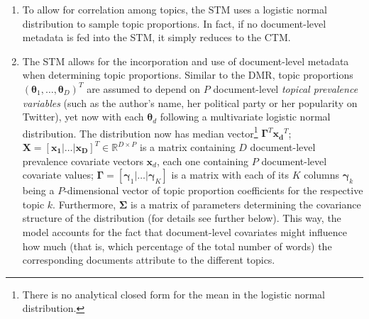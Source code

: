 \begin{enumerate}[label=(\roman*)]
\vspace{-0.25cm}
\item To allow for correlation among topics, the STM uses a logistic normal distribution to sample topic proportions. In fact, if no document-level metadata is fed into the STM, it simply reduces to the CTM.
\vspace{-0.25cm}
\item The STM allows for the incorporation and use of document-level metadata when determining topic proportions. Similar to the DMR, topic proportions $(\boldsymbol{\theta}_1,\dots,\boldsymbol{\theta}_D)^T$ are assumed to depend on $P$ document-level \textit{topical prevalence variables} (such as the author's name, her political party or her popularity on Twitter), yet now with each $\boldsymbol{\theta}_d$ following a multivariate logistic normal distribution. The distribution now has median vector\footnote{There is no analytical closed form for the mean in the logistic normal distribution.} $\boldsymbol{\Gamma}^T\boldsymbol{x_d}^T$; $\boldsymbol{X}=[\boldsymbol{x_1}|\dots|\boldsymbol{x_D}]^T \in \mathbb{R}^{D \times P}$ is a matrix containing $D$ document-level prevalence covariate vectors $\boldsymbol{x}_d$, each one containing $P$ document-level covariate values; $\boldsymbol{\Gamma} = [\boldsymbol{\gamma}_1|\dots|\boldsymbol{\gamma}_K]$ is a matrix with each of its $K$ columns $\boldsymbol{\gamma}_k$ being a $P$-dimensional vector of topic proportion coefficients for the respective topic $k$. Furthermore, $\boldsymbol{\Sigma}$ is a matrix of parameters determining the covariance structure of the distribution (for details see further below). This way, the model accounts for the fact that document-level covariates might influence how much (that is, which percentage of the total number of words) the corresponding documents attribute to the different topics.
\vspace{-0.25cm}

\end{enumerate}
